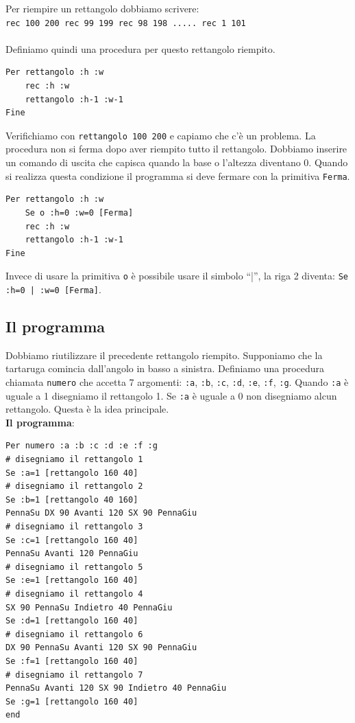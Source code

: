 Per riempire un rettangolo dobbiamo scrivere:\\
\texttt{rec 100 200 rec 99 199 rec 98 198  ..... rec 1 101}\\ \\
Definiamo quindi una procedura per questo rettangolo riempito.
\begin{lstlisting}[caption="Un rettangolo colorato"]
Per rettangolo :h :w
	rec :h :w
	rettangolo :h-1 :w-1
Fine
\end{lstlisting}

Verifichiamo con \texttt{rettangolo 100 200} e capiamo che c'è un problema. La procedura non si ferma dopo aver riempito tutto il rettangolo. Dobbiamo inserire un comando di uscita che capisca quando la base o l'altezza diventano 0. Quando si realizza questa condizione il programma si deve fermare con la primitiva \texttt{Ferma}.
\begin{lstlisting}[caption="Una migliore implementazione del rettangolo colorato"]
Per rettangolo :h :w
	Se o :h=0 :w=0 [Ferma]
	rec :h :w
	rettangolo :h-1 :w-1
Fine
\end{lstlisting}

Invece di usare la primitiva \texttt{o} è possibile usare il simbolo ``|'', la riga 2 diventa: \lstinline!Se :h=0 | :w=0 [Ferma]!.


\subsection{Il programma}
Dobbiamo riutilizzare il precedente rettangolo riempito. Supponiamo che la tartaruga comincia dall'angolo in basso a sinistra. Definiamo una procedura chiamata \texttt{numero} che accetta 7 argomenti: \texttt{:a}, \texttt{:b}, \texttt{:c}, \texttt{:d}, \texttt{:e}, \texttt{:f}, \texttt{:g}. Quando \texttt{:a} è uguale a 1 disegniamo il rettangolo 1. Se \texttt{:a} è uguale a 0 non disegniamo alcun rettangolo. Questa è la idea principale.\\
\textbf{Il programma}:
\begin{lstlisting}[caption="Disegnare un numero fatto di rettangoli"]
Per numero :a :b :c :d :e :f :g
# disegniamo il rettangolo 1
Se :a=1 [rettangolo 160 40]
# disegniamo il rettangolo 2
Se :b=1 [rettangolo 40 160]
PennaSu DX 90 Avanti 120 SX 90 PennaGiu
# disegniamo il rettangolo 3
Se :c=1 [rettangolo 160 40]
PennaSu Avanti 120 PennaGiu
# disegniamo il rettangolo 5
Se :e=1 [rettangolo 160 40]
# disegniamo il rettangolo 4
SX 90 PennaSu Indietro 40 PennaGiu
Se :d=1 [rettangolo 160 40]
# disegniamo il rettangolo 6
DX 90 PennaSu Avanti 120 SX 90 PennaGiu
Se :f=1 [rettangolo 160 40]
# disegniamo il rettangolo 7
PennaSu Avanti 120 SX 90 Indietro 40 PennaGiu 
Se :g=1 [rettangolo 160 40]
end
\end{lstlisting}


